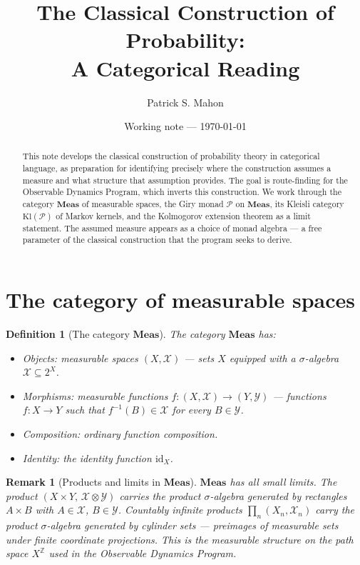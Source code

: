 \documentclass[11pt]{article}
\title{
The Classical Construction of Probability:\\
A Categorical Reading
}
\author{Patrick S. Mahon}
\date{Working note --- \today}
\newtheorem{definition}{Definition}
\newtheorem{remark}{Remark}
\newcommand{\Meas}{\mathbf{Meas}}
\newcommand{\Kl}{\mathrm{Kl}}
\newcommand{\Pcal}{\mathcal{P}}
\newcommand{\Xcal}{\mathcal{X}}
\newcommand{\Ycal}{\mathcal{Y}}
\newcommand{\id}{\mathrm{id}}
\begin{document}
\maketitle

\begin{abstract}
This note develops the classical construction of probability theory in
categorical language, as preparation for identifying precisely where the
construction assumes a measure and what structure that assumption provides.
The goal is route-finding for the Observable Dynamics Program, which inverts
this construction.  We work through the category $\Meas$ of measurable spaces,
the Giry monad $\Pcal$ on $\Meas$, its Kleisli category $\Kl(\Pcal)$ of
Markov kernels, and the Kolmogorov extension theorem as a limit statement.
The assumed measure appears as a choice of monad algebra --- a free parameter
of the classical construction that the program seeks to derive.
\end{abstract}

\tableofcontents

\section{The category of measurable spaces}

\begin{definition}[The category $\Meas$]\label{def:meas}
The category $\Meas$ has:
\begin{itemize}
  \item \emph{Objects}: measurable spaces $(X, \Xcal)$ --- sets $X$ equipped
    with a $\sigma$-algebra $\Xcal \subseteq 2^X$.
  \item \emph{Morphisms}: measurable functions $f : (X, \Xcal) \to (Y, \Ycal)$
    --- functions $f : X \to Y$ such that $f^{-1}(B) \in \Xcal$ for every
    $B \in \Ycal$.
  \item \emph{Composition}: ordinary function composition.
  \item \emph{Identity}: the identity function $\id_X$.
\end{itemize}
\end{definition}

\begin{remark}[Products and limits in $\Meas$]
$\Meas$ has all small limits.  The product $(X \times Y,\, \Xcal \otimes \Ycal)$
carries the product $\sigma$-algebra generated by rectangles $A \times B$ with
$A \in \Xcal$, $B \in \Ycal$.  Countably infinite products
$\prod_{n} (X_n, \Xcal_n)$ carry the product $\sigma$-algebra generated by
cylinder sets --- preimages of measurable sets under finite coordinate
projections.  This is the measurable structure on the path space
$X^{\mathbb{Z}}$ used in the Observable Dynamics Program.
\end{remark}
\end{document}
